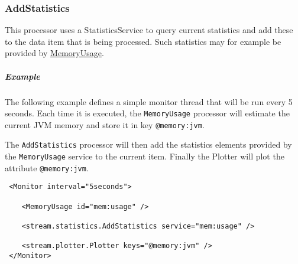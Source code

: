 \subsubsection{AddStatistics}

This processor uses a StatisticsService to query current statistics and
add these to the data item that is being processed. Such statistics may
for example be provided by
\href{../monitor/MemoryUsage.html}{MemoryUsage}.

\subparagraph{Example}

The following example defines a simple monitor thread that will be run
every 5 seconds. Each time it is executed, the \texttt{MemoryUsage}
processor will estimate the current JVM memory and store it in key
\texttt{@memory:jvm}.

The \texttt{AddStatistics} processor will then add the statistics
elements provided by the \texttt{MemoryUsage} service to the current
item. Finally the Plotter will plot the attribute \texttt{@memory:jvm}.

\begin{verbatim}
 <Monitor interval="5seconds">

    <MemoryUsage id="mem:usage" />

    <stream.statistics.AddStatistics service="mem:usage" />

    <stream.plotter.Plotter keys="@memory:jvm" />
 </Monitor>
\end{verbatim}


